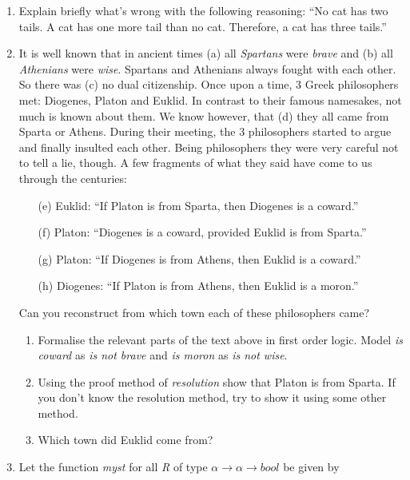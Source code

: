 \documentclass[a4paper,10pt,oneside]{scrartcl}
\begin{document}
\begin{enumerate}
\item Explain briefly what's wrong with the following reasoning:
``No cat has two tails. A cat has one more tail than no cat. Therefore, a cat has three tails.''

\item It is well known that in ancient times (a) all \emph{Spartans} were \emph{brave} and (b) all \emph{Athenians} were \emph{wise}.
Spartans and Athenians always fought with each other. So there was (c) no dual citizenship.
Once upon a time, 3 Greek philosophers met: Diogenes, Platon and Euklid. In contrast to their
famous namesakes, not much is known about them. We know however, that
(d) they all came from Sparta or Athens. 
During their meeting, the 3 philosophers started to argue and finally insulted each other.
Being philosophers they were very careful not to tell a lie, though.
A few fragments of what they said have come to us through the centuries:

\begin{enumerate}
\item[(e)] Euklid: ``If Platon is from Sparta, then Diogenes is a coward.''
\item[(f)] Platon: ``Diogenes is a coward, provided Euklid is from Sparta.''
\item[(g)] Platon: ``If Diogenes is from Athens, then Euklid is a coward.''
\item[(h)] Diogenes: ``If Platon is from Athens, then Euklid is a moron.''
\end{enumerate}

Can you reconstruct from which town each of these philosophers came?
\begin{enumerate}
\item Formalise the relevant parts of the text above in first order logic. Model \emph{is coward} as \emph{is not brave} and \emph{is moron} as \emph{is not wise}.
\item Using the proof method of \emph{resolution} show that Platon is from Sparta. If you
  don't know the resolution method, try to show it using some other method.
\item Which town did Euklid come from?
\end{enumerate}

\item Let the function \textit{myst} for all \textit{R} of type $\alpha \to \alpha \to \textit{bool}$ be given by 


\end{enumerate}
\end{document}
